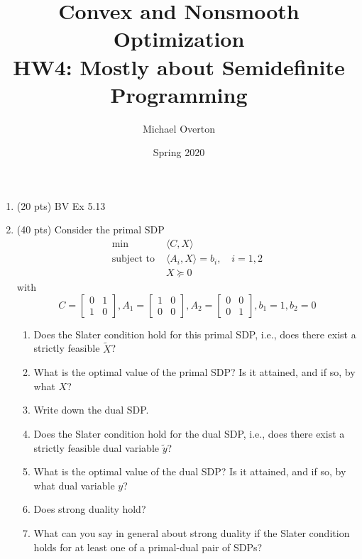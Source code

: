 \documentclass[11pt]{article}
\title{Convex and Nonsmooth Optimization\\
HW4: Mostly about Semidefinite Programming}
\author{Michael Overton}
\date{Spring 2020}
\newcommand{\st}{\text{subject to }}
\newcommand{\ip}[2]{\langle #1, #2 \rangle}
\newcommand{\twomat}[4]{\begin{bmatrix} #1 & #2 \\ #3 & #4 \end{bmatrix}}
\begin{document}
\maketitle
\begin{enumerate}
\item (20 pts) BV Ex 5.13
\item (40 pts) Consider the primal SDP 
\begin{align*}
\min & \ip{C}{X}\\
\st & \ip{A_i}{X}=b_i, \quad i=1,2\\
     &  X \succeq 0
\end{align*}
with 
\[
     C = \twomat{ 0}{1}{1}{0}, A_1=\twomat{1}{0}{0}{0}, A_2=\twomat{0}{0}{0}{1}, b_1=1, b_2=0
\]
\begin{enumerate}
\item Does the Slater condition hold for this primal SDP, i.e., does there exist a strictly feasible $\tilde X$?
\item What is the optimal value of the primal SDP?  Is it attained, and if so, by what $X$?
\item Write down the dual SDP.
\item Does the Slater condition hold for the dual SDP, i.e., does there exist a strictly feasible dual variable $\tilde y$?
\item What is the optimal value of the dual SDP? Is it attained, and if so, by what dual variable $y$?
\item Does strong duality hold?
\item What can you say in general about strong duality if the Slater condition holds for at least one of
a primal-dual pair of SDPs?


\end{enumerate}
\end{enumerate}
\end{document}
